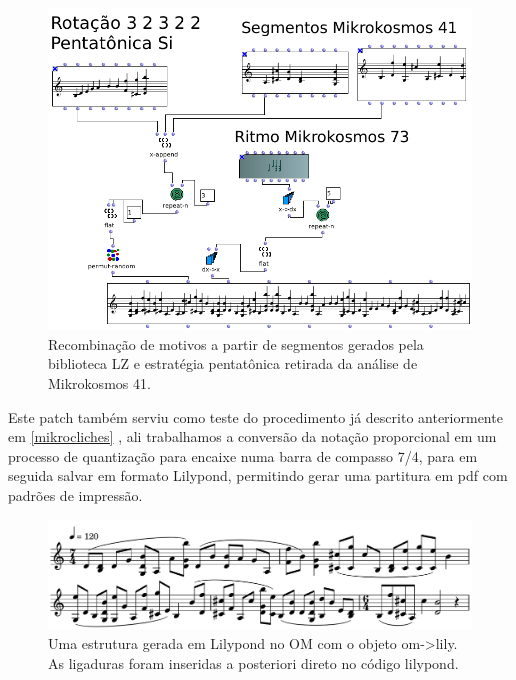 \documentclass[
	12pt,				%
	openright,			%
	twoside,			%
	a4paper,			%
	english,			%
	french,				%
	spanish,			%
	brazil				%
	]{abntex2}
\begin{document}
\begin{figure}[!h]
	\caption{\label{fig_grafico}Recombinação de motivos a partir de segmentos gerados pela biblioteca LZ e estratégia pentatônica retirada da análise de Mikrokosmos 41. }
	\begin{center}
	    \includegraphics[scale=0.4]{OMPD/Recombina_Mikros.png}
	\end{center}
\end{figure}

Este patch também serviu como teste do procedimento já descrito anteriormente em \autoref{mikrocliches} , ali trabalhamos a conversão da notação proporcional em um processo de quantização para encaixe numa barra de compasso 7/4, para em seguida salvar em formato Lilypond, permitindo gerar uma partitura em pdf com padrões de impressão.


\begin{figure}[!h]
	\caption{\label{fig_grafico}Uma estrutura gerada em Lilypond no OM com o objeto om->lily. As ligaduras foram inseridas a posteriori direto no código lilypond. }
	\begin{center}
	    \includegraphics[scale=0.3]{OMPD/recombinadoLILY.png}
	\end{center}
\end{figure}
\end{document}
